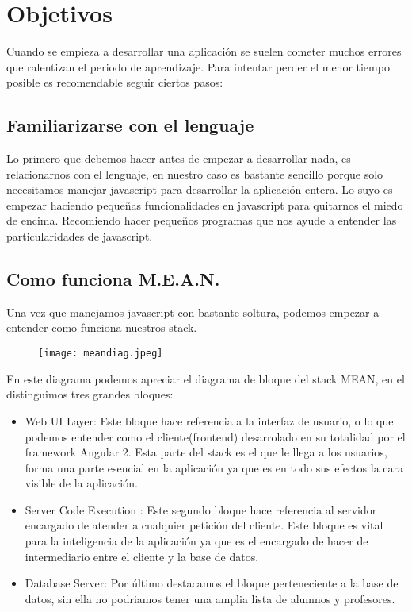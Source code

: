 \chapter{Objetivos}

Cuando se empieza a desarrollar una aplicación se suelen cometer muchos errores que ralentizan el periodo de aprendizaje. Para intentar perder el menor tiempo posible es recomendable seguir ciertos pasos:

\section{Familiarizarse con el lenguaje}
Lo primero que debemos hacer antes de empezar a desarrollar nada, es relacionarnos con el lenguaje, en nuestro caso es bastante sencillo porque solo necesitamos manejar javascript para desarrollar la aplicación entera. Lo suyo es empezar haciendo pequeñas funcionalidades en javascript para quitarnos el miedo de encima. Recomiendo hacer pequeños programas que nos ayude a entender las particularidades de javascript.


\section{Como funciona M.E.A.N.}

Una vez que manejamos javascript con bastante soltura, podemos empezar a entender como funciona nuestros stack.

\begin{figure}[H]
    \centering
    \texttt{[image: meandiag.jpeg]}
\end{figure}

En este diagrama podemos apreciar el diagrama de bloque del stack MEAN, en el distinguimos tres grandes bloques:

\begin{itemize}

    \item Web UI Layer: Este bloque hace referencia a la interfaz de usuario, o lo que podemos entender como el cliente(frontend) desarrolado en su totalidad por el framework Angular 2. Esta parte del stack es el que le llega a los usuarios, forma una parte esencial en la aplicación ya que es en todo sus efectos la cara visible de la aplicación.

    
    \item Server Code Execution : Este segundo bloque hace referencia al servidor encargado de atender a cualquier petición del cliente. Este bloque es vital para la inteligencia de la aplicación ya que es el encargado de hacer de intermediario entre el cliente y la base de datos. 


    \item Database Server: Por último destacamos el bloque perteneciente a la base de datos, sin ella no podriamos tener una amplia lista de alumnos y profesores. 

 
\end{itemize}

